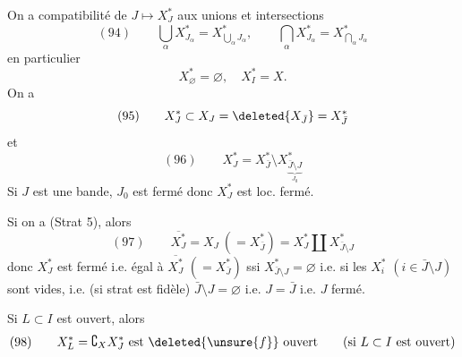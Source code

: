 
\deleted{\[X_J^*=X_{\bar J}\]}
On a compatibilité de $J\mapsto X_J^*$ aux unions et intersections
\[
(94)\qquad\bigcup_\alpha X_{J_\alpha}^*=X_{\bigcup_\alpha J_\alpha}^*,\qquad\bigcap_\alpha X_{J_\alpha}^*=X_{\bigcap_\alpha J_\alpha}^*
\]
en particulier
\[X_\varnothing^*=\varnothing,\quad X_I^*=X.\]
On a
\[(95)\qquad X_J^*\subset X_J=\deleted{X_{\bar J}}=X_{\bar J}^*\]
et
\[(96)\qquad X_J^*=X_{\bar J}^*\setminus X_{\underbrace{\bar J\setminus J}_{J_0}}^*\]
Si $J$ est une bande, $J_0$ est fermé donc $X_J^*$ est loc. fermé.

Si on a (Strat 5), alors
\[(97)\qquad\overline{X_J^*}=X_J\ (=X_{\bar J}^*)=X_J^*\amalg X_{\bar J\setminus J}^*\]
\deleted{\[\dot X_J\overset{\mathrm{déf}}=\overline{X_J^*}\setminus X_J^*\]}
donc  $X_J^*$ est fermé i.e. égal à $\overline{X_J^*}$ $(=X_{\bar J}^*)$ ssi $X_{\bar J\setminus J}^*=\varnothing$ i.e. si les $X_i^*$ $(i\in\bar J\setminus J)$ sont vides, i.e. (si strat est fidèle)  $\bar J\setminus J=\varnothing$ i.e. $J=\bar J$ i.e. $J$ fermé.

Si  $L\subset I$ est ouvert,  alors
\[(98)\qquad X_L^*=\complement_X X_J^*\text{ est }\deleted{\unsure{f}}\text{ ouvert}\qquad(\text{si }L\subset I\text{ est ouvert})\]
